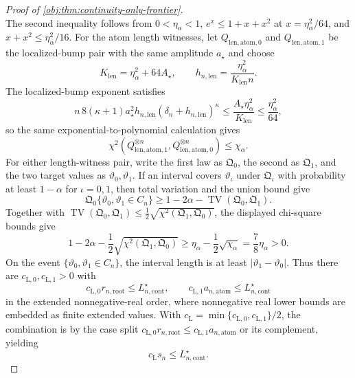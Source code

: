 \begin{proof}[Proof of \cref{obj:thm:continuity-only-frontier}]
\[\]
The second inequality follows from \(0<\eta_\alpha<1\),
\(e^x\leq1+x+x^2\) at \(x=\eta_\alpha^2/64\), and
\(x+x^2\leq\eta_\alpha^2/16\).  For the atom length witnesses, let
\(Q_{\mathrm{len},\mathrm{atom},0}\) and \(Q_{\mathrm{len},\mathrm{atom},1}\) be the localized-bump pair with the same amplitude \(a_\star\) and choose
\[
K_{\mathrm{len}}=\eta_\alpha^2+64A_\star,
\qquad
h_{n,\mathrm{len}}=\frac{\eta_\alpha^2}{K_{\mathrm{len}}n}.
\]
The localized-bump exponent satisfies
\[
n\,8(\kappa+1)a_\star^2h_{n,\mathrm{len}}
(\delta_n+h_{n,\mathrm{len}})^\kappa
\leq
\frac{A_\star\eta_\alpha^2}{K_{\mathrm{len}}}
\leq \frac{\eta_\alpha^2}{64},
\]
so the same exponential-to-polynomial calculation gives
\[
\chi^2(Q_{\mathrm{len},\mathrm{atom},1}^{\otimes n},
Q_{\mathrm{len},\mathrm{atom},0}^{\otimes n})\leq \chi_\alpha.
\]
For either length-witness pair, write the first law as \(\mathfrak Q_0\), the second as
\(\mathfrak Q_1\), and the two target values as \(\vartheta_0,\vartheta_1\).  If an interval covers
\(\vartheta_\iota\) under \(\mathfrak Q_\iota\) with probability at least \(1-\alpha\) for
\(\iota=0,1\), then total variation and the union bound give
\[
\mathfrak Q_0\{\vartheta_0,\vartheta_1\in C_n\}
\geq
1-2\alpha-\operatorname{TV}(\mathfrak Q_0,\mathfrak Q_1).
\]
Together with
\(\operatorname{TV}(\mathfrak Q_0,\mathfrak Q_1)\leq
\frac12\sqrt{\chi^2(\mathfrak Q_1,\mathfrak Q_0)}\), the displayed chi-square bounds give
\[
1-2\alpha-\frac12\sqrt{\chi^2(\mathfrak Q_1,\mathfrak Q_0)}
\geq
\eta_\alpha-\frac12\sqrt{\chi_\alpha}
=
\frac78\eta_\alpha>0 .
\]
On the event \(\{\vartheta_0,\vartheta_1\in C_n\}\), the interval length is at least
\(|\vartheta_1-\vartheta_0|\).  Thus there are \(c_{\mathrm L,0},c_{\mathrm L,1}>0\) with
\[
c_{\mathrm L,0}r_{n,\mathrm{root}}
\leq L_{n,\mathrm{cont}}^\star,
\qquad
c_{\mathrm L,1}a_{n,\mathrm{atom}}
\leq L_{n,\mathrm{cont}}^\star
\]
in the extended nonnegative-real order, where nonnegative real lower bounds are embedded as finite extended values.  With
\(c_{\mathrm L}=\min\{c_{\mathrm L,0},c_{\mathrm L,1}\}/2\), the combination is by the case split
\(c_{\mathrm L,0}r_{n,\mathrm{root}}\leq c_{\mathrm L,1}a_{n,\mathrm{atom}}\) or its complement, yielding
\[
c_{\mathrm L}s_n\leq L_{n,\mathrm{cont}}^\star .
\]


\end{proof}
